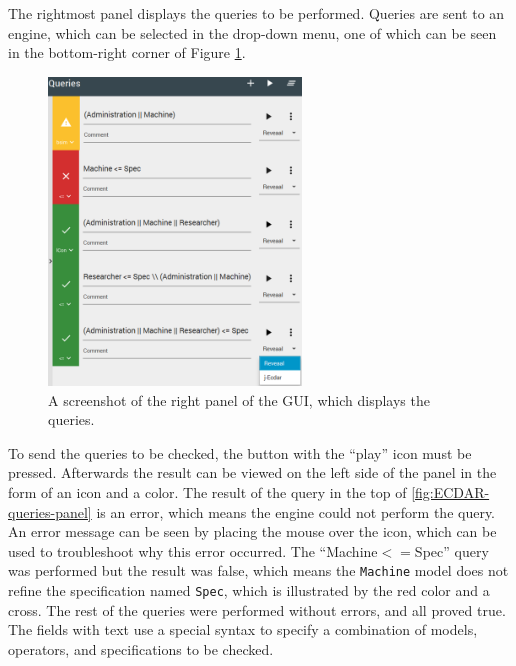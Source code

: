The rightmost panel displays the queries to be performed. 
Queries are sent to an engine, which can be selected in the drop-down menu, one of which can be seen in the bottom-right corner of Figure \ref{fig:ECDAR-queries-panel}. 
\begin{figure}[H]
    \centering
    \includegraphics[width=0.6\textwidth]{common/figures/right-panel.png}
    \caption{A screenshot of the right panel of the GUI, which displays the queries.}
    \label{fig:ECDAR-queries-panel}
\end{figure}
To send the queries to be checked, the button with the ``play'' icon must be pressed.
Afterwards the result can be viewed on the left side of the panel in the form of an icon and a color. 
The result of the query in the top of \autoref{fig:ECDAR-queries-panel} is an error, which means the engine could not perform the query. 
An error message can be seen by placing the mouse over the icon, which can be used to troubleshoot why this error occurred.
The ``Machine$<=$Spec'' query was performed but the result was false, which means the \texttt{Machine} model does not refine the specification named \texttt{Spec}, which is illustrated by the red color and a cross.
The rest of the queries were performed without errors, and all proved true. 
The fields with text use a special syntax to specify a combination of models, operators, and specifications to be checked.

